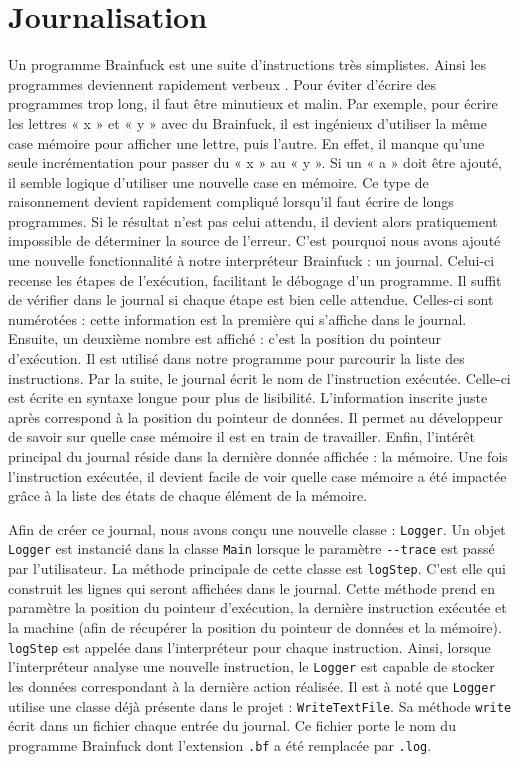 \documentclass[titlepage]{article}
\begin{document}
\section{Journalisation}
    Un programme Brainfuck est une suite d’instructions très simplistes. Ainsi les programmes deviennent rapidement verbeux . Pour éviter d’écrire des programmes trop long, il faut être minutieux et malin. Par exemple, pour écrire les lettres « x » et « y » avec du Brainfuck, il est ingénieux d’utiliser la même case mémoire pour afficher une lettre, puis l’autre. En effet, il manque qu’une seule incrémentation pour passer du « x » au « y ». Si un « a » doit être ajouté, il semble logique d’utiliser une nouvelle case en mémoire. Ce type de raisonnement devient rapidement compliqué lorsqu’il faut écrire de longs programmes. Si le résultat n’est pas celui attendu, il devient alors pratiquement impossible de déterminer la source de l’erreur. C’est pourquoi nous avons ajouté une nouvelle fonctionnalité à notre interpréteur Brainfuck : un journal. Celui-ci recense les étapes de l’exécution, facilitant le débogage d'un programme. Il suffit de vérifier dans le journal si chaque étape est bien celle attendue. Celles-ci sont numérotées : cette information est la première qui s’affiche dans le journal. Ensuite, un deuxième nombre est affiché : c’est la position du pointeur d’exécution. Il est utilisé dans notre programme pour parcourir la liste des instructions. Par la suite, le journal écrit le nom de l’instruction exécutée. Celle-ci est écrite en syntaxe longue pour plus de lisibilité. L’information inscrite juste après correspond à la position du pointeur de données. Il permet au développeur de savoir sur quelle case mémoire il est en train de travailler. Enfin, l’intérêt principal du journal réside dans la dernière donnée affichée : la mémoire. Une fois l’instruction exécutée, il devient facile de voir quelle case mémoire a été impactée grâce à la liste des états de chaque élément de la mémoire.

    Afin de créer ce journal, nous avons conçu une nouvelle classe : \texttt{Logger}. Un objet \texttt{Logger} est instancié dans la classe \texttt{Main} lorsque le paramètre \texttt{-{}-trace} est passé par l’utilisateur. La méthode principale de cette classe est \texttt{logStep}. C’est elle qui construit les lignes qui seront affichées dans le journal. Cette méthode prend en paramètre la position du pointeur d’exécution, la dernière instruction exécutée et la machine (afin de récupérer la position du pointeur de données et la mémoire). \texttt{logStep} est appelée dans l’interpréteur pour chaque instruction. Ainsi, lorsque l’interpréteur analyse une nouvelle instruction, le \texttt{Logger} est capable de stocker les données correspondant à la dernière action réalisée. Il est à noté que \texttt{Logger} utilise une classe déjà présente dans le projet : \texttt{WriteTextFile}. Sa méthode \texttt{write} écrit dans un fichier chaque entrée du journal. Ce fichier porte le nom du programme Brainfuck dont l'extension \texttt{.bf} a été remplacée par \texttt{.log}.
\end{document}
